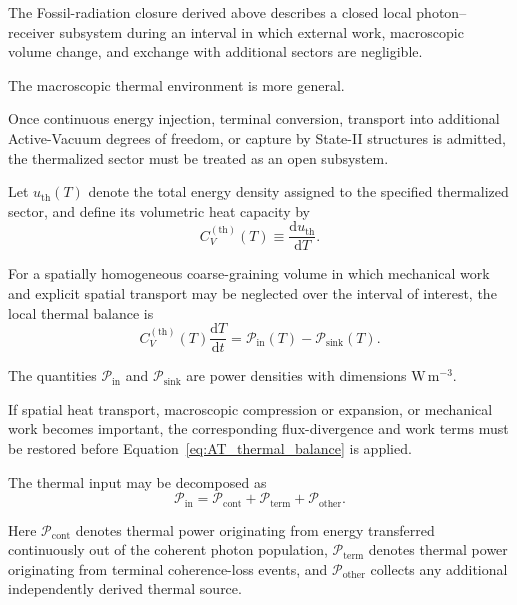 The Fossil-radiation closure derived above describes a closed local
photon--receiver subsystem during an interval in which external work,
macroscopic volume change, and exchange with additional sectors are
negligible.

The macroscopic thermal environment is more general.

Once continuous energy injection, terminal conversion, transport into
additional Active-Vacuum degrees of freedom, or capture by State-II
structures is admitted, the thermalized sector must be treated as an open
subsystem.

Let
\(u_{\mathrm{th}}(T)\)
denote the total energy density assigned to the specified thermalized sector,
and define its volumetric heat capacity by
\begin{equation}
    C_V^{(\mathrm{th})}(T)
    \equiv
    \frac{
        \mathrm d u_{\mathrm{th}}
    }{
        \mathrm dT
    }.
    \label{eq:AT_heat_capacity_definition}
\end{equation}

For a spatially homogeneous coarse-graining volume in which mechanical work
and explicit spatial transport may be neglected over the interval of
interest, the local thermal balance is
\begin{equation}
    C_V^{(\mathrm{th})}(T)
    \frac{
        \mathrm dT
    }{
        \mathrm dt
    }
    =
    \mathcal P_{\mathrm{in}}(T)
    -
    \mathcal P_{\mathrm{sink}}(T).
    \label{eq:AT_thermal_balance}
\end{equation}

The quantities
\(\mathcal P_{\mathrm{in}}\)
and
\(\mathcal P_{\mathrm{sink}}\)
are power densities with dimensions
\(\mathrm{W\,m^{-3}}\).

If spatial heat transport, macroscopic compression or expansion, or
mechanical work becomes important, the corresponding flux-divergence and
work terms must be restored before
Equation~\eqref{eq:AT_thermal_balance}
is applied.

The thermal input may be decomposed as
\begin{equation}
    \mathcal P_{\mathrm{in}}
    =
    \mathcal P_{\mathrm{cont}}
    +
    \mathcal P_{\mathrm{term}}
    +
    \mathcal P_{\mathrm{other}}.
    \label{eq:AT_input_power}
\end{equation}

Here
\(\mathcal P_{\mathrm{cont}}\)
denotes thermal power originating from energy transferred continuously out of
the coherent photon population,
\(\mathcal P_{\mathrm{term}}\)
denotes thermal power originating from terminal coherence-loss events, and
\(\mathcal P_{\mathrm{other}}\)
collects any additional independently derived thermal source.

